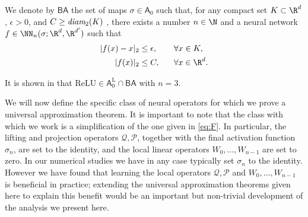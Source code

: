\begin{definition}
\label{def:bounded_activations}
We denote by \(\mathsf{BA}\) the set of maps \(\sigma \in \mathsf{A}_0\) such that,
for any compact set \(K \subset \R^d\), \(\epsilon > 0\), and \(C \geq \emph{\text{diam}}_2(K)\) 
, there exists 
a number \(n \in \N\) and a neural network \(f \in \NN_n(\sigma;\R^d,\R^{d'})\) such that
\begin{align*}
|f(x) - x|_2 &\leq \epsilon, \qquad \forall x \in K, \\
|f(x)|_2 &\leq C, \quad \:\:\: \forall x \in \R^d.
\end{align*} 
\end{definition}
It is shown in \cite[Lemma C.1]{lanthaler2021error} that \(\text{ReLU} \in \mathsf{A}^{\text{L}}_0 \cap \mathsf{BA}\) with \(n=3\).

We will now define the specific class of neural operators for which we prove
a universal approximation theorem. It is important to note that the class
with which we work is a simplification of the one given in \eqref{eq:F}. In particular, the lifting and projection operators \(\mathcal{Q}, \mathcal{P}\), together with the final 
activation function \(\sigma_n\), are set to the identity, and the local linear operators \(W_0,\dots,W_{n-1}\) are set to zero. In our numerical studies we have in any case
typically set \(\sigma_n\) to the identity. However we have found that learning the local
operators \(\mathcal{Q}, \mathcal{P}\) and \(W_0,\dots,W_{n-1}\) is beneficial in practice;
extending the universal approximation theorems given here to explain this benefit 
would be an important but non-trivial development of the analysis we present here.




